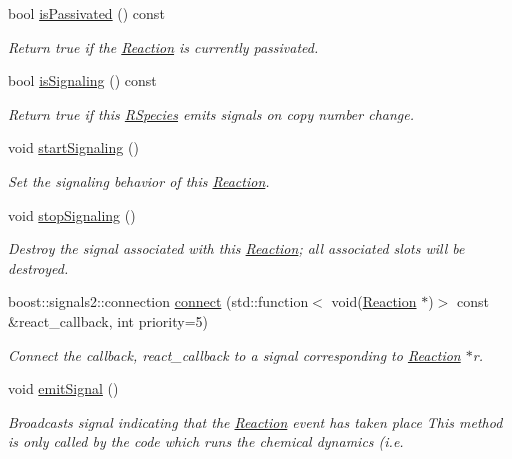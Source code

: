 \begin{DoxyCompactItemize}
bool \hyperlink{classchem_1_1Reaction_a6c03b9b74a8da07b51a6924bfe2f9571}{is\-Passivated} () const 
\begin{DoxyCompactList}\small\item\em Return true if the \hyperlink{classchem_1_1Reaction}{Reaction} is currently passivated. \end{DoxyCompactList}\item 
bool \hyperlink{classchem_1_1Reaction_a316db368606eb9aaf47dfbde6d48f606}{is\-Signaling} () const 
\begin{DoxyCompactList}\small\item\em Return true if this \hyperlink{classchem_1_1RSpecies}{R\-Species} emits signals on copy number change. \end{DoxyCompactList}\item 
void \hyperlink{classchem_1_1Reaction_a584613fe0d634660a1814744c76a4208}{start\-Signaling} ()
\begin{DoxyCompactList}\small\item\em Set the signaling behavior of this \hyperlink{classchem_1_1Reaction}{Reaction}. \end{DoxyCompactList}\item 
void \hyperlink{classchem_1_1Reaction_ace48838b7b1bac957e840ad7b2f4a4e1}{stop\-Signaling} ()
\begin{DoxyCompactList}\small\item\em Destroy the signal associated with this \hyperlink{classchem_1_1Reaction}{Reaction}; all associated slots will be destroyed. \end{DoxyCompactList}\item 
boost\-::signals2\-::connection \hyperlink{classchem_1_1Reaction_af427c88bd882105d317f99d5a9f4a34d}{connect} (std\-::function$<$ void(\hyperlink{classchem_1_1Reaction}{Reaction} $\ast$)$>$ const \&react\-\_\-callback, int priority=5)
\begin{DoxyCompactList}\small\item\em Connect the callback, react\-\_\-callback to a signal corresponding to \hyperlink{classchem_1_1Reaction}{Reaction} $\ast$r. \end{DoxyCompactList}\item 
void \hyperlink{classchem_1_1Reaction_ab76db5606306efa0772f7833a5f2ce68}{emit\-Signal} ()
\begin{DoxyCompactList}\small\item\em Broadcasts signal indicating that the \hyperlink{classchem_1_1Reaction}{Reaction} event has taken place This method is only called by the code which runs the chemical dynamics (i.\-e. \end{DoxyCompactList}\item 

\end{DoxyCompactItemize}

